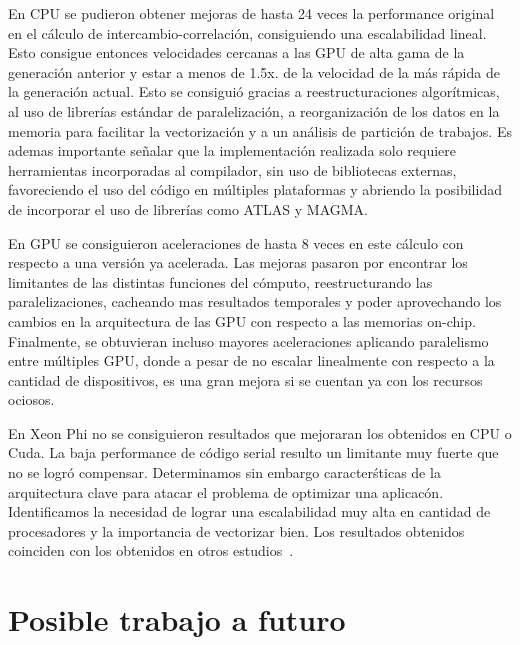 En CPU se pudieron obtener mejoras de hasta 24 veces la performance original en el c\'alculo de intercambio-correlaci\'on,
consiguiendo una escalabilidad lineal. Esto consigue entonces velocidades cercanas a las GPU de alta gama
de la generaci\'on anterior y estar a menos de 1.5x. de la velocidad de la m\'as r\'apida de la generaci\'on actual.
Esto se consigui\'o gracias a reestructuraciones algor\'itmicas, al uso de librer\'ias est\'andar de paralelizaci\'on,
a reorganizaci\'on de los datos en la memoria para facilitar la vectorizaci\'on y a un an\'alisis de partici\'on de trabajos.
Es ademas importante se\~nalar que la implementaci\'on realizada solo requiere herramientas incorporadas al compilador,
sin uso de bibliotecas externas, favoreciendo el uso del c\'odigo en m\'ultiples plataformas y abriendo la posibilidad
de incorporar el uso de librer\'ias como ATLAS y MAGMA.

En GPU se consiguieron aceleraciones de hasta 8 veces en este c\'alculo con respecto a una versi\'on ya acelerada.
Las mejoras pasaron por encontrar los limitantes de las distintas funciones del c\'omputo, reestructurando las paralelizaciones,
cacheando mas resultados temporales y poder aprovechando los cambios en la arquitectura de las GPU con respecto a las memorias
on-chip. Finalmente, se obtuvieran incluso mayores aceleraciones aplicando paralelismo entre m\'ultiples
GPU, donde a pesar de no escalar linealmente con respecto a la cantidad de dispositivos, es una gran mejora
si se cuentan ya con los recursos ociosos.

En Xeon Phi no se consiguieron resultados que mejoraran los obtenidos en CPU o
Cuda. La baja performance de c\'odigo serial resulto un limitante muy
fuerte que no se logr\'o compensar. Determinamos sin embargo caracter\'sticas
de la arquitectura clave para atacar el problema de optimizar una aplicac\'on.
Identificamos la necesidad de lograr una escalabilidad muy alta en cantidad de
procesadores y la importancia de vectorizar bien.  Los resultados obtenidos
coinciden con los obtenidos en otros estudios~\cite{Jeffers}.

\section{Posible trabajo a futuro}

